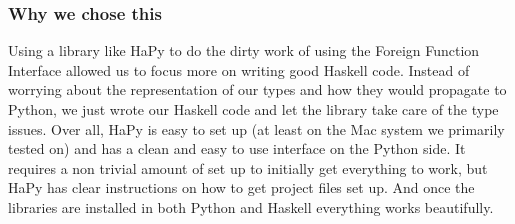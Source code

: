 \documentclass[12pt]{article}
\begin{document}
        \subsubsection{Why we chose this}
            Using a library like HaPy to do the dirty work of using the Foreign Function Interface
            allowed us to focus more on writing good Haskell code. Instead of worrying about 
            the representation of our types and how they would propagate to Python, we just wrote
            our Haskell code and let the library take care of the type issues. Over all, HaPy is
            easy to set up (at least on the Mac system we primarily tested on) and has a clean
            and easy to use interface on the Python side. It requires a non trivial amount
            of set up to initially get everything to work, but HaPy has clear instructions
            on how to get project files set up. And once the libraries are installed in both
            Python and Haskell everything works beautifully. 
\end{document}
